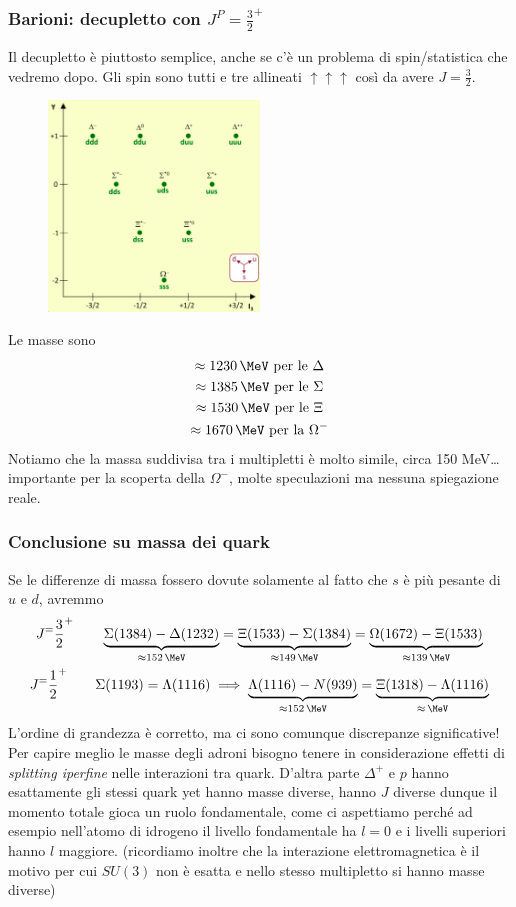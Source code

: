 \subsubsection{Barioni: decupletto con $J^P=\frac32^+$}
Il decupletto è piuttosto semplice, anche se c'è un problema di spin/statistica che vedremo dopo. Gli spin sono tutti e tre allineati $\uparrow\uparrow\uparrow$ così da avere $J=\frac32$.
\begin{figure}[H]
    \centering
    \includegraphics[width=0.5\textwidth]{immagini/fig_baryon_32_quarks.png}
    \caption{}
\end{figure} 
Le masse sono
  \begin{gather*}
  \approx1230\,\MeV\text{ per le }\Delta\\
  \approx1385\,\MeV\text{ per le }\Sigma\\
  \approx1530\,\MeV\text{ per le }\Xi\\
  \approx1670\,\MeV\text{ per la }\Omega^-
  \end{gather*}
  Notiamo che la massa suddivisa tra i multipletti è molto simile, circa 150 MeV\dots importante per la scoperta della $\Omega^-$, molte speculazioni ma nessuna spiegazione reale.
\subsubsection{Conclusione su massa dei quark}
Se le differenze di massa fossero dovute solamente al fatto che $s$ è più pesante di $u$ e $d$, avremmo 
\begin{gather*}
J^=\frac32^+\qquad \underbrace{\Sigma(1384)-\Delta(1232)}_{\approx152\,\MeV}=\underbrace{\Xi(1533)-\Sigma(1384)}_{\approx149\,\MeV}=\underbrace{\Omega(1672)-\Xi(1533)}_{\approx139\,\MeV}\\
J^=\frac12^+\qquad
\Sigma(1193)=\Lambda(1116)\implies
\underbrace{\Lambda(1116)-N(939)}_{\approx152\,\MeV}=\underbrace{\Xi(1318)-\Lambda(1116)}_{\approx\,\MeV}
\end{gather*}
L'ordine di grandezza è corretto, ma ci sono comunque discrepanze significative! Per capire meglio le masse degli adroni bisogno tenere in considerazione effetti di \textit{splitting iperfine} nelle interazioni tra quark. D'altra parte $\Delta^+$ e $p$ hanno esattamente gli stessi quark yet hanno masse diverse, hanno $J$ diverse dunque il momento totale gioca un ruolo fondamentale, come ci aspettiamo perché ad esempio nell'atomo di idrogeno il livello fondamentale ha $l=0$ e i livelli superiori hanno $l$ maggiore. (ricordiamo inoltre che la interazione elettromagnetica è il motivo per cui $SU(3)$ non è esatta e nello stesso multipletto si hanno masse diverse)
